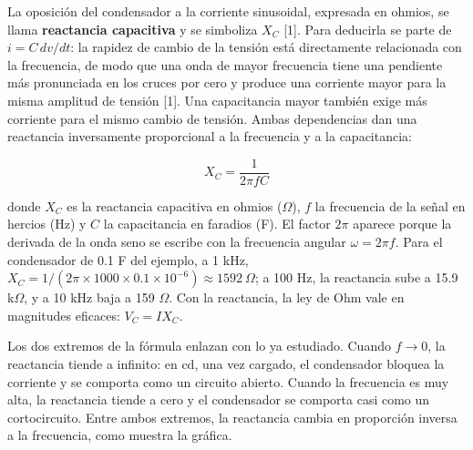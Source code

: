 \documentclass[11pt,letterpaper]{article}
\begin{document}
La oposición del condensador a la corriente sinusoidal, expresada en ohmios, se llama \textbf{reactancia capacitiva} y se simboliza $X_C$ [1]. Para deducirla se parte de $i = C\,dv/dt$: la rapidez de cambio de la tensión está directamente relacionada con la frecuencia, de modo que una onda de mayor frecuencia tiene una pendiente más pronunciada en los cruces por cero y produce una corriente mayor para la misma amplitud de tensión [1]. Una capacitancia mayor también exige más corriente para el mismo cambio de tensión. Ambas dependencias dan una reactancia inversamente proporcional a la frecuencia y a la capacitancia:

\begin{equation}
  X_C = \frac{1}{2\pi f C}
\end{equation}

donde $X_C$ es la reactancia capacitiva en ohmios (\ensuremath{\Omega}), $f$ la frecuencia de la señal en hercios (Hz) y $C$ la capacitancia en faradios (F). El factor $2\pi$ aparece porque la derivada de la onda seno se escribe con la frecuencia angular $\omega = 2\pi f$. Para el condensador de 0.1 \textmu{}F del ejemplo, a 1 kHz, $X_C = 1/(2\pi \times 1000 \times 0.1 \times 10^{-6}) \approx 1592\ \Omega$; a 100 Hz, la reactancia sube a 15.9 k\ensuremath{\Omega}, y a 10 kHz baja a 159 \ensuremath{\Omega}. Con la reactancia, la ley de Ohm vale en magnitudes eficaces: $V_C = I X_C$.

Los dos extremos de la fórmula enlazan con lo ya estudiado. Cuando $f \to 0$, la reactancia tiende a infinito: en cd, una vez cargado, el condensador bloquea la corriente y se comporta como un circuito abierto. Cuando la frecuencia es muy alta, la reactancia tiende a cero y el condensador se comporta casi como un cortocircuito. Entre ambos extremos, la reactancia cambia en proporción inversa a la frecuencia, como muestra la gráfica.
\end{document}
